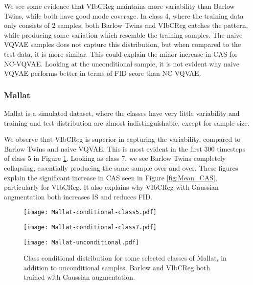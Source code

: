 \documentclass[../../thesis.tex]{subfiles}
\begin{document}
We see some evidence that VIbCReg maintains more variability than Barlow Twins, while both have good mode coverage. In class 4, where the training data only consists of 2 samples, both Barlow Twins and VIbCReg catches the pattern, while producing some variation which resemble the training samples. The naive VQVAE samples does not capture this distribution, but when compared to the test data, it is more similar. This could explain the minor increase in CAS for NC-VQVAE. Looking at the unconditional sample, it is not evident why naive VQVAE performs better in terms of FID score than NC-VQVAE.


\subsubsection{Mallat}
Mallat is a simulated dataset, where the classes have very little variability and training and test distribution are almost indistinguishable, except for sample size. \newline

We observe that VIbCReg is superior in capturing the variability, compared to Barlow Twins and naive VQVAE. This is most evident in the first 300 timesteps of class 5 in Figure \ref{fig:Gaussian_Mallat}. Looking as class 7, we see Barlow Twins completely collapsing, essentially producing the same sample over and over. These figures explain the significant increase in CAS seen in Figure \ref{fig:Mean_CAS}, particularly for VIbCReg. It also explains why VIbCReg with Gaussian augmentation both increases IS and reduces FID. \newline

\begin{figure}[h]
    \centering
    \begin{minipage}[b]{0.32\textwidth}
        \centering
        \texttt{[image: Mallat-conditional-class5.pdf]}
    \end{minipage}
    \begin{minipage}[b]{0.32\textwidth}
        \centering
        \texttt{[image: Mallat-conditional-class7.pdf]}
    \end{minipage}
    \begin{minipage}[b]{0.32\textwidth}
        \centering
        \texttt{[image: Mallat-unconditional.pdf]}
    \end{minipage}
    \caption{Class conditional distribution for some selected classes of Mallat, in addition to unconditional samples. Barlow and VIbCReg both trained with Gaussian augmentation.}
    \label{fig:Gaussian_Mallat}
\end{figure}
\end{document}
